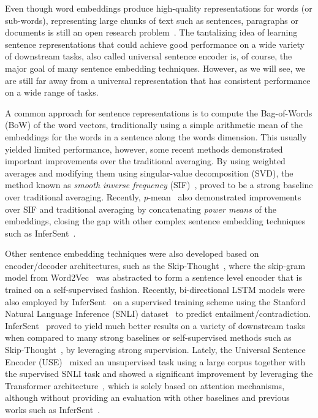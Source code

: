 \documentclass{article}
\begin{document}
Even though word embeddings produce high-quality representations for words (or sub-words), representing large chunks of text such as sentences, paragraphs or documents is still an open research problem~\cite{conneau2017supervised}. The tantalizing idea of learning sentence representations that could achieve good performance on a wide variety of downstream tasks, also called universal sentence encoder is, of course, the major goal of many sentence embedding techniques. However, as we will see, we are still far away from a universal representation that has consistent performance on a wide range of tasks.

A common approach for sentence representations is to compute the Bag-of-Words (BoW) of the word vectors, traditionally using a simple arithmetic mean of the embeddings for the words in a sentence along the words dimension. This usually yielded limited performance, however, some recent methods demonstrated important improvements over the traditional averaging. By using weighted averages and modifying them using singular-value decomposition (SVD), the method known as \emph{smooth inverse frequency} (SIF)~\cite{arora2016simple}, proved to be a strong baseline over traditional averaging. Recently, \textit{p}-mean~\cite{DBLP:journals/corr/abs-1803-01400} also demonstrated improvements over SIF and traditional averaging by concatenating \emph{power means} of the embeddings, closing the gap with other complex sentence embedding techniques such as InferSent~\cite{conneau2017supervised}.

Other sentence embedding techniques were also developed based on encoder/decoder architectures, such as the Skip-Thought~\cite{kiros2015skip}, where the skip-gram model from Word2Vec~\cite{mikolov2013distributed} was abstracted to form a sentence level encoder that is trained on a self-supervised fashion. Recently, bi-directional LSTM models were also employed by InferSent~\cite{conneau2017supervised} on a supervised training scheme using the Stanford Natural Language
Inference (SNLI) dataset~\cite{bowman2015large} to predict entailment/contradiction. InferSent~\cite{conneau2017supervised} proved to yield much better results on a variety of downstream tasks when compared to many strong baselines or self-supervised methods such as Skip-Thought~\cite{kiros2015skip}, by leveraging strong supervision. Lately, the Universal Sentence Encoder (USE)~\cite{DBLP:journals/corr/abs-1803-11175} mixed an unsupervised task using a large corpus together with the supervised SNLI task and showed a significant improvement by leveraging the Transformer architecture~\cite{vaswani2017attention}, which is solely based on attention mechanisms, although without providing an evaluation with other baselines and previous works such as InferSent~\cite{conneau2017supervised}.
\end{document}
